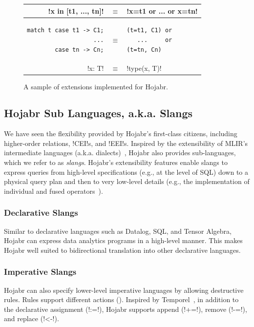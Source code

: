 \documentclass[sigconf,nonacm]{acmart}
\begin{document}
\begin{figure}[t]
\begin{tabular}{|r c l|}
!x in [t1, ..., tn]! &$\equiv$& !x=t1 or ... or x=tn! \\ \hline
\begin{lstlisting}
match t case t1 -> C1;
        ...
        case tn -> Cn;
\end{lstlisting} & 
$\equiv$ &
\begin{lstlisting}
(t=t1, C1) or 
   ...     or 
(t=tn, Cn)
\end{lstlisting} \\ \hline
!x: T! & $\equiv$ & !type(x, T)! \\ \hline
\end{tabular}
\vspace{-0.3cm}
\caption{A sample of extensions implemented for Hojabr.}
\label{fig:extension}
\vspace{-0.3cm}
\end{figure}



\subsection{Hojabr Sub Languages, a.k.a. Slangs}
We have seen the flexibility provided by Hojabr’s first-class citizens, including higher-order relations, !CEI!s, and !EEI!s. Inspired by the extensibility of MLIR’s intermediate languages (a.k.a. dialects)~\cite{lattner2021mlir}, Hojabr also provides sub-languages, which we refer to as \textit{slangs}. Hojabr’s extensibility features enable slangs to express queries from high-level specifications (e.g., at the level of SQL) down to a physical query plan and then to very low-level details (e.g., the implementation of individual and fused operators~\cite{shaikhha2018push,menon2017relaxed}).

\subsubsection{Declarative Slangs} Similar to declarative languages such as Datalog, SQL, and Tensor Algebra, Hojabr can express data analytics programs in a high-level manner. This makes Hojabr well suited to bidirectional translation into other declarative languages.

\subsubsection{Imperative Slangs} Hojabr can also specify lower-level imperative languages by allowing destructive rules. Rules support different actions (). Inspired by Temporel~\cite{DBLP:journals/pacmmod/ShaikhhaSSN24}, in addition to the declarative assignment (!:=!), Hojabr supports append (!+=!), remove (!-=!), and replace (!<-!).
\end{document}
